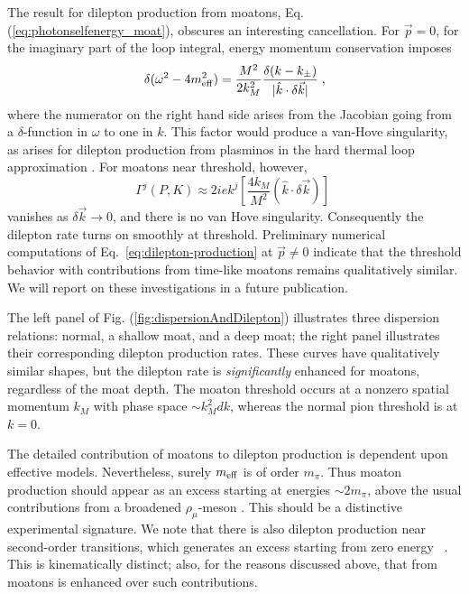 \documentclass[twocolumn,prd,superscriptaddress, colorlinks, linkcolor=refcol, citecolor=refcol, urlcolor=refcol]{revtex4-2}
\begin{document}
The result for dilepton production from moatons, 
Eq. (\ref{eq:photonselfenergy_moat}), obscures
an interesting cancellation.
For $\vec{p} = 0$, for the imaginary part of the loop integral,
energy momentum conservation imposes
%
\begin{equation}
    \delta(\omega^2 - 4 m_{\rm eff}^2) = 
    \frac{M^2}{2 k_M^2} \frac{\delta(k - k_\pm)}{|\hat{k} \cdot \delta \vec{k}|} \; ,
    \label{delta_sing}
\end{equation}
%
where the numerator on the right hand side arises from the Jacobian going from a $\delta$-function in $\omega$ to one in $k$.
This factor would produce a van-Hove singularity, as arises for dilepton production from plasminos in the hard thermal loop approximation \cite{Braaten:1990wp}.
For moatons near threshold, however, 
%
\begin{equation}
    \Gamma^j(P,K) \approx 2i e k^j
    \left[ \frac{4 k_M}{M^2} ( \hat{k} \cdot \delta \vec{k}) \right]
    \label{vertex_canc}
    \; 
\end{equation}
%
vanishes as $\delta \vec{k} \rightarrow 0$,
and there is no van Hove singularity.  Consequently
the dilepton rate turns on smoothly at threshold. 
Preliminary numerical computations of Eq.~\eqref{eq:dilepton-production} at $\vec p \neq 0$ indicate that the threshold behavior with contributions from time-like moatons remains qualitatively similar.
We will report on these investigations in a future publication.

The left panel of Fig. (\ref{fig:dispersionAndDilepton}) illustrates three
dispersion relations: normal, a shallow moat,
and a deep moat;
the right panel illustrates their corresponding dilepton production rates. 
These curves have qualitatively similar shapes,
but the dilepton rate is {\it significantly}
enhanced for moatons, regardless of the moat depth. 
The moaton threshold occurs at a nonzero spatial momentum $k_M$ with phase space $\sim k_M^2 dk$,
whereas the normal pion threshold is at $k=0$.

The detailed contribution of moatons to dilepton production is dependent upon effective models.  Nevertheless, surely $m_{\rm eff}$
is of order $m_\pi$.  Thus moaton production should appear
as an excess starting at energies $\sim 2 m_\pi$, above
the usual contributions from a broadened $\rho_\mu$-meson
\cite{Rapp:1999ej,Rapp:2000zd, Rapp:2016xzw}.  This should
be a distinctive experimental signature.
We note that there is also dilepton production near second-order transitions, which generates an excess starting from zero energy ~\cite{Nishimura:2022mku,Nishimura:2023oqn,Nishimura:2024kvz}.
This is kinematically distinct; also, for the reasons discussed above, that from moatons is enhanced over such contributions.\\
\end{document}
